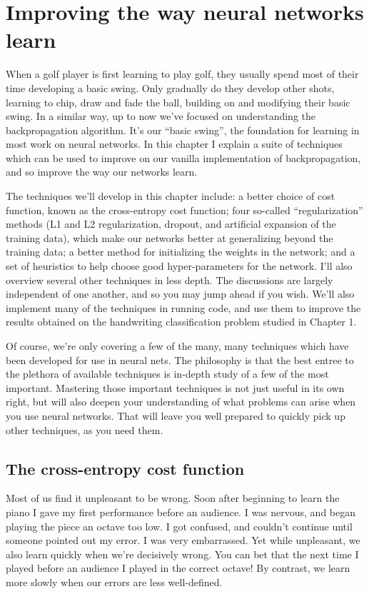\documentclass[a4paper,twoside,10pt]{book}
\begin{document}
\chapter{Improving the way neural networks learn}
When a golf player is first learning to play golf, they usually spend most of their time developing a basic swing. Only gradually do they develop other shots, learning to chip, draw and fade the ball, building on and modifying their basic swing. In a similar way, up to now we've focused on understanding the backpropagation algorithm. It's our ``basic swing'', the foundation for learning in most work on neural networks. In this chapter I explain a suite of techniques which can be used to improve on our vanilla implementation of backpropagation, and so improve the way our networks learn.

The techniques we'll develop in this chapter include: a better choice of cost function, known as the cross-entropy cost function; four so-called ``regularization'' methods (L1 and L2 regularization, dropout, and artificial expansion of the training data), which make our networks better at generalizing beyond the training data; a better method for initializing the weights in the network; and a set of heuristics to help choose good hyper-parameters for the network. I'll also overview several other techniques in less depth. The discussions are largely independent of one another, and so you may jump ahead if you wish. We'll also implement many of the techniques in running code, and use them to improve the results obtained on the handwriting classification problem studied in Chapter 1.

Of course, we're only covering a few of the many, many techniques which have been developed for use in neural nets. The philosophy is that the best entree to the plethora of available techniques is in-depth study of a few of the most important. Mastering those important techniques is not just useful in its own right, but will also deepen your understanding of what problems can arise when you use neural networks. That will leave you well prepared to quickly pick up other techniques, as you need them.

\section{The cross-entropy cost function}
Most of us find it unpleasant to be wrong. Soon after beginning to learn the piano I gave my first performance before an audience. I was nervous, and began playing the piece an octave too low. I got confused, and couldn't continue until someone pointed out my error. I was very embarrassed. Yet while unpleasant, we also learn quickly when we're decisively wrong. You can bet that the next time I played before an audience I played in the correct octave! By contrast, we learn more slowly when our errors are less well-defined.
\end{document}
